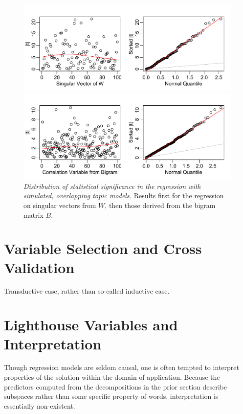 \documentclass[12pt]{article}
\begin{document}
 
 \begin{figure}
 \caption{ \label{fig:simregr}
  {\sl Distribution of statistical significance in the regression with simulated, overlapping topic models.} Results first for the regression on singular vectors from $W$, then those derived from the bigram matrix $B$.}
   \centerline{ \includegraphics[width=5in]{figures/simregrW}  }
   \centerline{ \includegraphics[width=5in]{figures/simregrB}  }
 \end{figure}

\section{Variable Selection and Cross Validation}
\label{sec:cv}

Transductive case, rather than so-called inductive case.

\section{Lighthouse Variables and Interpretation}
\label{sec:light}
 
 Though regression models are seldom causal, one is often tempted to interpret
 properties of the solution within the domain of application.  Because the
 predictors computed from the decompositions in the prior section describe
 subspaces rather than some specific property of words, interpretation is
 essentially non-existent.
\end{document}
